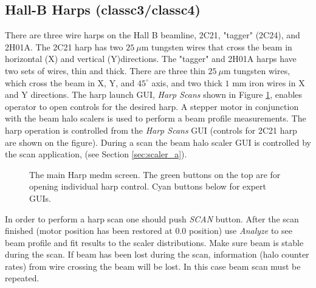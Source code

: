 \documentclass[12pt]{article}
\begin{document}
\subsection{Hall-B Harps (classc3/classc4)\label{sec:harp}}
\indent

There are three wire harps on the Hall B beamline, 2C21, "tagger" (2C24), and 2H01A. The 2C21 harp has two $25~\mu$m tungsten wires that cross the beam in horizontal (X) and vertical (Y)directions. The "tagger" and 2H01A harps have two sets of wires, thin and thick. There are three thin $25~\mu$m tungsten wires, which cross the beam in X, Y, and $45^\circ$ axis, and two thick $1$ mm iron wires in X and Y directions. The harp launch GUI, {\it Harp Scans} shown in Figure \ref{harpmain}, enables operator to open controls for the desired harp. A stepper motor in conjunction
with the beam halo scalers is used to perform a beam profile measurements. The harp operation is controlled from the {\it Harp Scans} GUI (controls for 2C21 harp are shown on the figure). During a scan the beam halo scaler GUI is controlled by the scan application,  (see Section \ref{sec:scaler_a}).

\begin{figure}[tbhp]
{\centering {} \par}
\caption{The main Harp medm screen. The green buttons on the top are for opening individual harp control. Cyan buttons below for expert GUIs.}
\label{harpmain}
\end{figure}

In order to perform a harp scan one should push {\it SCAN} button. After the scan finished (motor position has been restored at $0.0$ position) use {\it Analyze} to see beam profile and fit results to the scaler distributions. Make sure beam is stable during the scan. If beam has been lost during the scan, information (halo counter rates) from wire crossing the beam will be lost. In this case beam scan must be repeated.  
\end{document}
